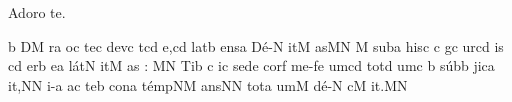 \beginhymn Adoro te.

\Internote
{}
\initiumgregorianum
\znotes\fissum{1pt}\bmolle b\en
{}%
\sgn {}{}D\punctum M\egn
{}r\punctum a\egn
\sgn {}o{}\punctum c\egn
\spatium
\begingroup
\bgenerale
\sgn te{}\punctumcavum c\egn
\spatium
\sgn dev\punctum c\egn
{}t\pes cd\egn
\sgn {}e,\punctum c\augmentum d\egn
\spatium
\divisiominima
\spatium
\sgn l{a}t\punctum b\egn
\sgn {}e{ns}\punctum a\egn
\spatium
\sgn D{\'e}-\punctum N\egn
\sgn {}it\punctum M\egn
\sgn {}as\punctum M\augmentum N\egn
\spatium
\divisiominor
\spatium
{}\punctum M\egn
\spatium
\sgn sub\punctum a\egn
\spatium
\sgn his\punctum c\egn
\spatium
\custos c
\lineaproxima
g\punctum c\egn
\sgn {}ur\pes cd\egn
\sgn {}i{s }\punctum c\augmentum d\egn
\spatium
\divisiominima
\spatium
{}er\punctum b\egn
\sgn {}e{}\punctum a\egn
\spatium
\sgn l{\'a}t\punctum N\egn
\sgn {}it\punctum M\egn
\sgn {}a{s : }\punctum M\augmentum N\egn
\spatium
\divisiomaior
\spatium
\sgn T{i}b%
\punctum c\egn
\sgn {}i{}\punctum c\egn
\spatium
\sgn se{}\pes de\egn
\spatium
\sgn cor\punctum f\egn
\spatium
\sgn m{e}-\clivis fe\egn
\sgn {}um\punctum c\augmentum d\egn
\spatium
\divisiominima
\spatium
\sgn t{o}t\punctum d\egn
\sgn {}um\punctum c\egn
\spatium
\custos b
\lineaproxima
\sgn s{\'u}b\punctum b\egn
\sgn jic\punctum a\egn
\sgn {}i{t,}\engl{}\punctum N\augmentum N\egn
\spatium
\divisiominor
\spatium
{}i-\punctum a\egn
\sgn {}a{}\punctum c\egn
\spatium
\sgn te{}\punctum b\egn
\spatium
\sgn con\punctum a\egn
\sgn t{\'e}{mp}\clivis NM\egn
{}a{ns}\punctum N\augmentum N\egn
\spatium
\divisiominima
\spatium
\sgn t{o}t\punctum a\egn
\sgn {}um\punctum M\egn
\spatium
\sgn d{\'e}-\punctum N\egn
{}c\punctum M\egn
\sgn {}i{t.}\punctum M\augmentum N\egn
\spatium
\endgroup
\Finisgregoriana

\bigskip

\beginlyrics

